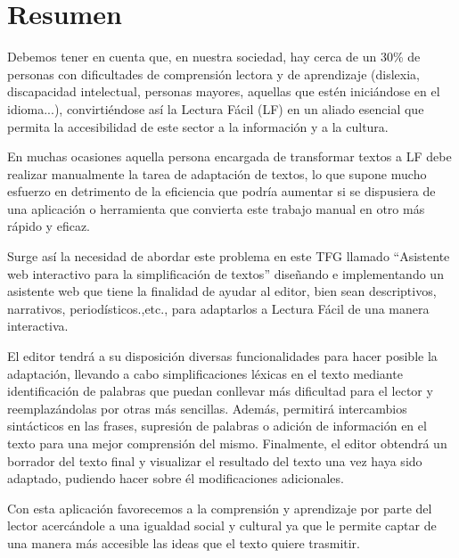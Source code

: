 \chapter*{Resumen}

Debemos tener en cuenta que, en nuestra sociedad, hay cerca de un 30\% de personas con dificultades de comprensión lectora y de aprendizaje (dislexia, discapacidad intelectual, personas mayores, aquellas que estén iniciándose en el idioma...), convirtiéndose así la Lectura Fácil (LF) en un aliado esencial que permita la accesibilidad de este sector a la información y a la cultura. 

 \setlength{\parskip}{10pt}

En muchas ocasiones aquella persona encargada de transformar textos a LF debe realizar manualmente la tarea de adaptación de textos, lo que supone mucho esfuerzo en detrimento de la eficiencia que podría aumentar si se dispusiera de una aplicación o herramienta que convierta este trabajo manual en otro más rápido y eficaz.

 \setlength{\parskip}{10pt}

Surge así la necesidad de abordar este problema en este TFG llamado ``Asistente web interactivo para la simplificación de textos'' diseñando e implementando un asistente web que tiene la finalidad de ayudar al editor, bien sean descriptivos, narrativos, periodísticos.,etc., para adaptarlos a Lectura Fácil de una manera interactiva. 

 \setlength{\parskip}{10pt}

El editor tendrá a su disposición diversas funcionalidades para hacer posible la adaptación, llevando a cabo simplificaciones léxicas en el texto mediante identificación de palabras que puedan conllevar más dificultad para el lector y reemplazándolas por otras más sencillas. Además, permitirá intercambios sintácticos en las frases, supresión de palabras o adición de información en el texto para una mejor comprensión del mismo. Finalmente, el editor obtendrá un borrador del texto final y visualizar el resultado del texto una vez haya sido adaptado, pudiendo hacer sobre él modificaciones adicionales.

 \setlength{\parskip}{10pt}

Con esta aplicación favorecemos a la comprensión y aprendizaje por parte del lector acercándole a una igualdad social y cultural ya que le permite captar de una manera más accesible las ideas que el texto quiere trasmitir.



